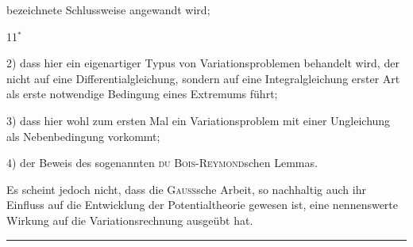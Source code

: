 bezeichnete Schlussweise angewandt wird;
\par\noindent\hfill 11$^{\ast}$\hspace*{5em}\par
\clearpage{}
\noindent\hspace*{\parindent}2) dass hier ein eigenartiger Typus von Variationsproblemen behandelt
wird, der nicht auf eine Differentialgleichung, sondern auf eine Integralgleichung erster Art als erste notwendige Bedingung eines Extremums führt;
\par\noindent\hspace*{\parindent}3) dass hier wohl zum ersten Mal ein Variationsproblem mit einer Ungleichung als Nebenbedingung vorkommt;
\par\noindent\hspace*{\parindent}4) der Beweis des sogenannten \textsc{du Bois-Reymond}schen Lemmas.
\par\noindent\hspace*{\parindent}Es scheint jedoch nicht, dass die \textsc{Gauss}sche Arbeit, so nachhaltig auch
ihr Einfluss auf die Entwicklung der Potentialtheorie gewesen ist, eine nennenswerte Wirkung auf die Variationsrechnung ausgeübt hat.
\par\begin{center}\rule{.18\linewidth}{.3pt}\end{center}
\clearpage\endgroup
